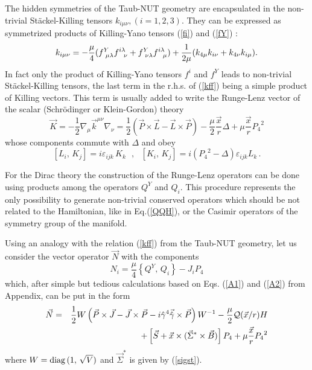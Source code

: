 \documentclass[a4paper,12pt]{article}
\begin{document}
The hidden symmetries of the Taub-NUT geometry are encapsulated in 
the non-trivial St\" ackel-Killing tensors $k_{i\mu\nu}, (i=1,2,3)$.
They can be expressed as symmetrized products of Killing-Yano tensors 
(\ref{fi}) and  (\ref{fY}) \cite{VV}:
\begin{equation}\label{kff}
k_{i\mu\nu} = -{\mu\over 4}(f^Y_{~\mu\lambda}f^{i\lambda}_{~~\nu} +
f^Y_{~\nu\lambda}f^{i\lambda}_{~~\mu})+{1\over 2\mu}(k_{4\mu}k_{i\nu} +
k_{4\nu}k_{i\mu}).
\end{equation}
In fact only the product of Killing-Yano tensors $f^i$ and $f^Y$ leads 
to non-trivial St\" ackel-Killing tensors, the last term in the r.h.s. 
of (\ref{kff}) being a simple product of Killing vectors. This term is 
usually added to write the Runge-Lenz vector of the scalar (Schr\" odinger 
or Klein-Gordon) theory \cite{GRFH,CV1}
\begin{equation}\label{RLorb}   
\vec{K}=-\frac{1}{2}\nabla_{\mu}\vec{k}^{\mu\nu}\nabla_{\nu}=
\frac{1}{2}(\vec{P}\times \vec{L}-\vec{L}\times \vec{P})-
\frac{\mu}{2}\frac{\vec{x}}{r}\Delta +\mu\frac{\vec{x}}{r}{P_{4}}^{2}
\end{equation}
whose components commute with $\Delta$ and obey 
\begin{equation}\label{comk}
\left[ L_{i},\, K_{j} \right] = i \varepsilon_{ijk}\,K_{k}~~~,~~~ 
\left[ K_{i},\, K_{j} \right] = i ({P_4}^2-\Delta)\varepsilon_{ijk}L_{k}\,. 
\end{equation}

For the Dirac theory the construction of the Runge-Lenz operators can 
be done using products among the operators $Q^Y$ and $Q_i$. This 
procedure represents the only possibility to generate non-trivial 
conserved operators which should be not related to the Hamiltonian, like in 
Eq.(\ref{QQH}), or the Casimir operators of the symmetry group of the 
manifold.

Using an analogy with the relation (\ref{kff}) from the Taub-NUT 
geometry, let us consider the vector operator $\vec{N}$ with the  
components  
\begin{equation}
{N}_{i}=\frac{\mu}{4}\left\{ Q^{Y},\, Q_{i}\right\}-J_{i}P_{4}
\end{equation}
which, after simple but tedious calculations based on Eqs. (\ref{A1}) and 
(\ref{A2}) from Appendix, can be put in the form
\begin{eqnarray}\label{N}
\vec{N}&=&\frac{1}{2}W\left(\vec{P}\times \vec{J}-\vec{J}\times \vec{P}-
i\hat\gamma^{4}\vec{\hat\gamma}\times \vec{P}\right)W^{-1}-
\frac{\mu}{2}{\cal Q}(\vec{x}/r)H\nonumber\\ 
&&+\left[\vec{S}+\vec{x}\times(\vec{\Sigma}^{*}\times \vec{B})\right]P_{4}
+\mu\frac{\vec{x}}{r}{P_{4}}^{2} \label{NN}
\end{eqnarray}
where $W={\rm diag}\,(1,\,\sqrt{V})$ and $\vec{\Sigma}^{*}$ is given by 
(\ref{sigst}).
\end{document}
